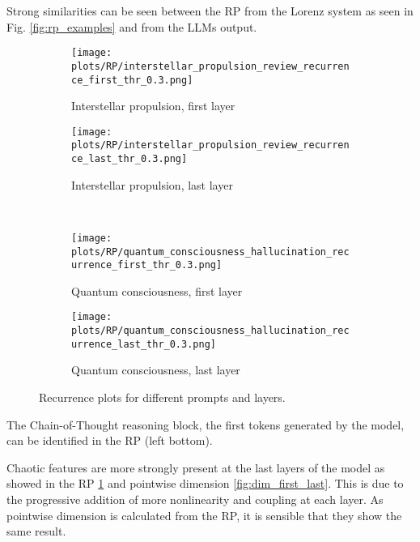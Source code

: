 \documentclass[a4paper,12pt]{article}
\begin{document}
Strong similarities can be seen between the RP from the Lorenz \cite{DeterministicNonperiodicFlow} system as seen in Fig. \ref{fig:rp_examples} and from the LLMs output. %
\begin{figure}[H]
    \centering
    \begin{subfigure}[b]{0.48\textwidth}
        \centering
        \texttt{[image: plots/RP/interstellar\_propulsion\_review\_recurrence\_first\_thr\_0.3.png]}
        \caption{Interstellar propulsion, first layer}
    \end{subfigure}\hfill
    \begin{subfigure}[b]{0.48\textwidth}
        \centering
        \texttt{[image: plots/RP/interstellar\_propulsion\_review\_recurrence\_last\_thr\_0.3.png]}
        \caption{Interstellar propulsion, last layer}
    \end{subfigure}
    \\[0.5em]
    \begin{subfigure}[b]{0.48\textwidth}
        \centering
        \texttt{[image: plots/RP/quantum\_consciousness\_hallucination\_recurrence\_first\_thr\_0.3.png]}
        \caption{Quantum consciousness, first layer}
    \end{subfigure}\hfill
    \begin{subfigure}[b]{0.48\textwidth}
        \centering
        \texttt{[image: plots/RP/quantum\_consciousness\_hallucination\_recurrence\_last\_thr\_0.3.png]}
        \caption{Quantum consciousness, last layer}
    \end{subfigure}
    \caption{Recurrence plots for different prompts and layers.}
    \label{fig:rp_comparison_layers}           
\end{figure}

The Chain-of-Thought reasoning block, the first tokens generated by the model, can be identified in the RP (left bottom).

Chaotic features are more strongly present at the last layers of the model as showed in the RP \ref{fig:rp_comparison_layers} and pointwise dimension \ref{fig:dim_first_last}. This is due to the progressive addition of more nonlinearity and coupling at each layer. As pointwise dimension is calculated from the RP, it is sensible that they show the same result.
\end{document}
